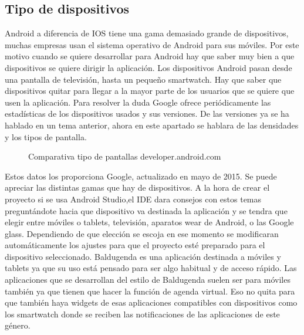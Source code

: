 \subsection{Tipo de dispositivos}
\label{subsecc:Tipo de dispositivos}

Android a diferencia de IOS tiene una gama demasiado grande de dispositivos, muchas empresas usan el sistema operativo de Android para sus móviles.
Por este motivo cuando se quiere desarrollar para Android hay que saber muy bien a que dispositivos se quiere dirigir la aplicación.
Los dispositivos Android pasan desde una pantalla de televisión, hasta un pequeño smartwatch.
Hay que saber que dispositivos quitar para llegar a la mayor parte de los usuarios que se quiere que usen la aplicación.
Para resolver la duda Google ofrece periódicamente las estadísticas de los dispositivos usados y sus versiones.
De las versiones ya se ha hablado en un tema anterior, ahora en este apartado se hablara de las densidades y los tipos de pantalla.

\begin{figure}[H] 
  \begin{center} 
    \caption{Comparativa tipo de pantallas developer.android.com} 
    \label{fig:ComparativaPantallas} 
  \end{center} 
\end{figure}

Estos datos los proporciona Google, actualizado en mayo de 2015.
Se puede apreciar las distintas gamas que hay de dispositivos. A la hora de crear el proyecto si se usa Android Studio,el IDE dara consejos con estos temas preguntándote hacia que dispositivo va destinada la aplicación y se tendra  que elegir entre móviles o tablets, televisión, aparatos wear de Android, o las Google glass.
Dependiendo de que elección se escoja en ese momento se modificaran automáticamente los ajustes para que el proyecto esté preparado para el dispositivo seleccionado.
Baldugenda es una aplicación destinada a móviles y tablets ya que su uso está pensado para ser algo habitual y de acceso rápido.
Las aplicaciones que se desarrollan del estilo de Baldugenda suelen ser para móviles también ya que tienen que hacer la función de agenda virtual. Eso no quita para que también haya widgets de esas aplicaciones compatibles con dispositivos como los smartwatch donde se reciben las notificaciones de las aplicaciones de este género.


